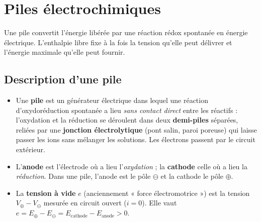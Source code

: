 \chapter{Piles électrochimiques}
\label{ch:piles}

Une pile convertit l'énergie libérée par une réaction rédox spontanée en énergie électrique. L'enthalpie libre fixe à la fois la tension qu'elle peut délivrer et l'énergie maximale qu'elle peut fournir.

\section{Description d'une pile}

\begin{definition}
\begin{itemize}
  \item Une \textbf{pile} est un générateur électrique dans lequel une réaction d'oxydoréduction spontanée a lieu \emph{sans contact direct} entre les réactifs : l'oxydation et la réduction se déroulent dans deux \textbf{demi-piles} séparées, reliées par une \textbf{jonction électrolytique} (pont salin, paroi poreuse) qui laisse passer les ions sans mélanger les solutions. Les électrons passent par le circuit extérieur.
  \item L'\textbf{anode} est l'électrode où a lieu l'\emph{oxydation} ; la \textbf{cathode} celle où a lieu la \emph{réduction}. Dans une pile, l'anode est le pôle $\ominus$ et la cathode le pôle $\oplus$.
  \item La \textbf{tension à vide} $e$ (anciennement « force électromotrice ») est la tension $V_\oplus - V_\ominus$ mesurée en circuit ouvert ($i = 0$). Elle vaut $e = E_\oplus - E_\ominus = E_{\text{cathode}} - E_{\text{anode}} > 0$.
\end{itemize}
\end{definition}


